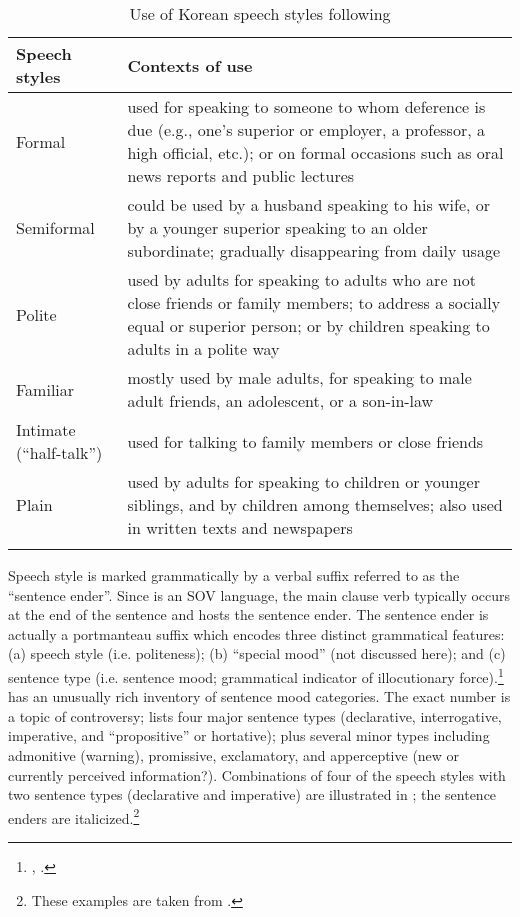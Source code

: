 \begin{table}
 \caption{Use of Korean speech styles following \citet[120]{Pak2008}}

\label{extab:11.22}
\begin{tabularx}{\textwidth}{L{2.5cm}Q}
\lsptoprule
 Speech styles & Contexts of use\\
 \midrule
 Formal & used for speaking to someone to whom deference is due (e.g., one’s superior or employer, a professor, a high official, etc.); or on formal occasions such as oral news reports and public lectures\\
 \tablevspace
 Semiformal & could be used by a husband speaking to his wife, or by a younger superior speaking to an older subordinate; gradually disappearing from daily usage\\
  \tablevspace
 Polite & used by adults for speaking to adults who are not close friends or family members; to address a socially equal or superior person; or by children speaking to adults in a polite way\\
  \tablevspace
 Familiar & mostly used by male adults, for speaking to male adult friends, an adolescent, or a son-in-law\\
 \tablevspace
 Intimate (“half-talk”) & used for talking to family members or close friends\\
 \tablevspace
 Plain & used by adults for speaking to children or younger siblings, and by children among themselves; also used in written texts and newspapers\\
\lspbottomrule
\end{tabularx}
\end{table}

Speech style is marked grammatically by a verbal suffix referred to as the “sentence ender”. Since  is an SOV language, the main clause verb typically occurs at the end of the sentence and hosts the sentence ender. The sentence ender is actually a portmanteau suffix which encodes three distinct grammatical features: (a) speech style (i.e. politeness); (b) “special mood” (not discussed here); and (c) sentence type (i.e. sentence mood; grammatical indicator of illocutionary force).\footnote{\citet{Sohn1999}, \citet{Pak2008}.}  has an unusually rich inventory of sentence mood categories. The exact number is a topic of controversy; \citet{Sohn1999} lists four major sentence types (declarative, interrogative, imperative, and “propositive” or hortative); plus several minor types including admonitive (warning), promissive, exclamatory, and apperceptive (new or currently perceived information?). Combinations of four of the speech styles with two sentence types (declarative and imperative) are illustrated in ; the sentence enders are italicized.\footnote{These examples are taken from \citet{PakEtAl2013}.}
 
